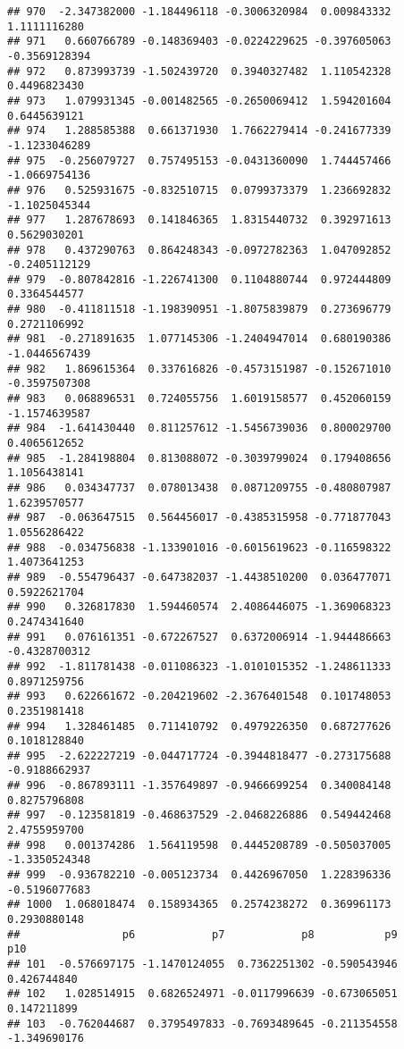 \documentclass[
]{article}
\begin{document}
\begin{verbatim}
## 970  -2.347382000 -1.184496118 -0.3006320984  0.009843332  1.1111116280
## 971   0.660766789 -0.148369403 -0.0224229625 -0.397605063 -0.3569128394
## 972   0.873993739 -1.502439720  0.3940327482  1.110542328  0.4496823430
## 973   1.079931345 -0.001482565 -0.2650069412  1.594201604  0.6445639121
## 974   1.288585388  0.661371930  1.7662279414 -0.241677339 -1.1233046289
## 975  -0.256079727  0.757495153 -0.0431360090  1.744457466 -1.0669754136
## 976   0.525931675 -0.832510715  0.0799373379  1.236692832 -1.1025045344
## 977   1.287678693  0.141846365  1.8315440732  0.392971613  0.5629030201
## 978   0.437290763  0.864248343 -0.0972782363  1.047092852 -0.2405112129
## 979  -0.807842816 -1.226741300  0.1104880744  0.972444809  0.3364544577
## 980  -0.411811518 -1.198390951 -1.8075839879  0.273696779  0.2721106992
## 981  -0.271891635  1.077145306 -1.2404947014  0.680190386 -1.0446567439
## 982   1.869615364  0.337616826 -0.4573151987 -0.152671010 -0.3597507308
## 983   0.068896531  0.724055756  1.6019158577  0.452060159 -1.1574639587
## 984  -1.641430440  0.811257612 -1.5456739036  0.800029700  0.4065612652
## 985  -1.284198804  0.813088072 -0.3039799024  0.179408656  1.1056438141
## 986   0.034347737  0.078013438  0.0871209755 -0.480807987  1.6239570577
## 987  -0.063647515  0.564456017 -0.4385315958 -0.771877043  1.0556286422
## 988  -0.034756838 -1.133901016 -0.6015619623 -0.116598322  1.4073641253
## 989  -0.554796437 -0.647382037 -1.4438510200  0.036477071  0.5922621704
## 990   0.326817830  1.594460574  2.4086446075 -1.369068323  0.2474341640
## 991   0.076161351 -0.672267527  0.6372006914 -1.944486663 -0.4328700312
## 992  -1.811781438 -0.011086323 -1.0101015352 -1.248611333  0.8971259756
## 993   0.622661672 -0.204219602 -2.3676401548  0.101748053  0.2351981418
## 994   1.328461485  0.711410792  0.4979226350  0.687277626  0.1018128840
## 995  -2.622227219 -0.044717724 -0.3944818477 -0.273175688 -0.9188662937
## 996  -0.867893111 -1.357649897 -0.9466699254  0.340084148  0.8275796808
## 997  -0.123581819 -0.468637529 -2.0468226886  0.549442468  2.4755959700
## 998   0.001374286  1.564119598  0.4445208789 -0.505037005 -1.3350524348
## 999  -0.936782210 -0.005123734  0.4426967050  1.228396336 -0.5196077683
## 1000  1.068018474  0.158934365  0.2574238272  0.369961173  0.2930880148
##                p6            p7            p8           p9          p10
## 101  -0.576697175 -1.1470124055  0.7362251302 -0.590543946  0.426744840
## 102   1.028514915  0.6826524971 -0.0117996639 -0.673065051  0.147211899
## 103  -0.762044687  0.3795497833 -0.7693489645 -0.211354558 -1.349690176

\end{verbatim}
\end{document}
